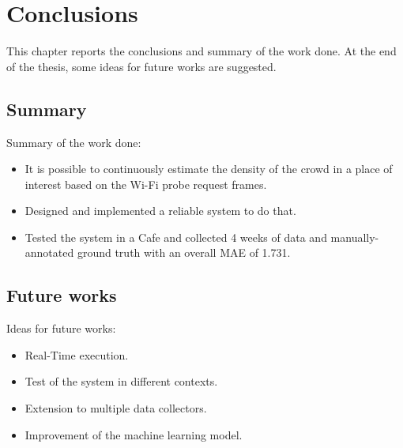 \chapter{Conclusions}
\label{cha:conclusions}
\vspace{0.4 cm} 

This chapter reports the conclusions and summary of the work done. At the end of the thesis, some ideas for future works are suggested.


\section{Summary}
\label{sec:future}
\vspace{0.2 cm} 

Summary of the work done:
\begin{itemize}
  \item It is possible to continuously estimate the density of the crowd in a place of interest based on the Wi-Fi probe request frames.
  \item Designed and implemented a reliable system to do that.
  \item Tested the system in a Cafe and collected 4 weeks of data and manually-annotated ground truth with an overall MAE of 1.731.
\end{itemize}


\section{Future works}
\label{sec:future}
\vspace{0.2 cm} 

Ideas for future works:
\begin{itemize}
  \item Real-Time execution.
  \item Test of the system in different contexts.
  \item Extension to multiple data collectors.
  \item Improvement of the machine learning model.
\end{itemize}
